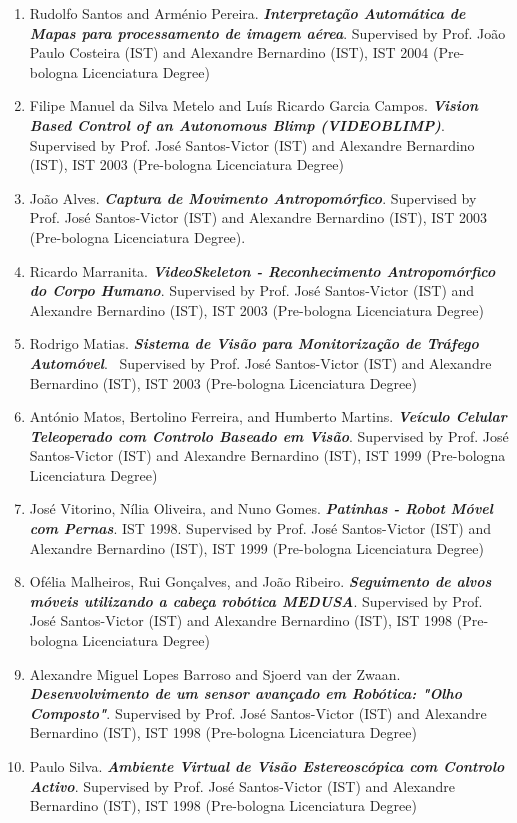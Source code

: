 \begin{enumerate}
  Degree).
\item
  Rudolfo Santos and Arménio Pereira. \emph{\textbf{Interpretação
  Automática de Mapas para processamento de imagem aérea}}. Supervised
  by Prof. João Paulo Costeira (IST) and Alexandre Bernardino (IST), IST
  2004 (Pre-bologna Licenciatura Degree)
\item
  Filipe Manuel da Silva Metelo and Luís Ricardo Garcia Campos.
  \emph{\textbf{Vision Based Control of an Autonomous Blimp
  (VIDEOBLIMP)}}. Supervised by Prof. José Santos-Victor (IST) and
  Alexandre Bernardino (IST), IST 2003 (Pre-bologna Licenciatura Degree)
\item
  João Alves. \emph{\textbf{Captura de Movimento Antropomórfico}}.
  Supervised by Prof. José Santos-Victor (IST) and Alexandre Bernardino
  (IST), IST 2003 (Pre-bologna Licenciatura Degree).
\item
  Ricardo Marranita. \emph{\textbf{VideoSkeleton - Reconhecimento
  Antropomórfico do Corpo Humano}}. Supervised by Prof. José
  Santos-Victor (IST) and Alexandre Bernardino (IST), IST 2003
  (Pre-bologna Licenciatura Degree)
\item
  Rodrigo Matias. \emph{\textbf{Sistema de Visão para Monitorização de
  Tráfego Automóvel}}.~ Supervised by Prof. José Santos-Victor (IST) and
  Alexandre Bernardino (IST), IST 2003 (Pre-bologna Licenciatura Degree)
\item
  António Matos, Bertolino Ferreira, and Humberto Martins.
  \emph{\textbf{Veículo Celular Teleoperado com Controlo Baseado em
  Visão}}. Supervised by Prof. José Santos-Victor (IST) and Alexandre
  Bernardino (IST), IST 1999 (Pre-bologna Licenciatura Degree)
\item
  José Vitorino, Nília Oliveira, and Nuno Gomes. \emph{\textbf{Patinhas
  - Robot Móvel com Pernas}}. IST 1998. Supervised by Prof. José
  Santos-Victor (IST) and Alexandre Bernardino (IST), IST 1999
  (Pre-bologna Licenciatura Degree)
\item
  Ofélia Malheiros, Rui Gonçalves, and João Ribeiro.
  \emph{\textbf{Seguimento de alvos móveis utilizando a cabeça robótica
  MEDUSA}}. Supervised by Prof. José Santos-Victor (IST) and Alexandre
  Bernardino (IST), IST 1998 (Pre-bologna Licenciatura Degree)
\item
  Alexandre Miguel Lopes Barroso and Sjoerd van der Zwaan.
  \emph{\textbf{Desenvolvimento de um sensor avançado em Robótica: "Olho
  Composto"}}. Supervised by Prof. José Santos-Victor (IST) and
  Alexandre Bernardino (IST), IST 1998 (Pre-bologna Licenciatura Degree)
\item
  Paulo Silva. \emph{\textbf{Ambiente Virtual de Visão Estereoscópica
  com Controlo Activo}}. Supervised by Prof. José Santos-Victor (IST)
  and Alexandre Bernardino (IST), IST 1998 (Pre-bologna Licenciatura
  Degree)
\end{enumerate}

